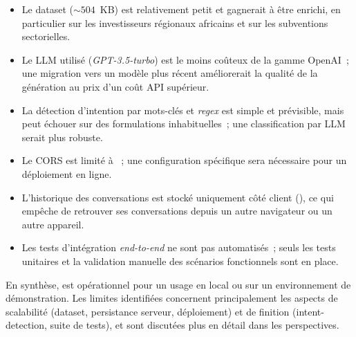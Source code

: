 \begin{itemize}
  \item Le dataset (${\sim}504$~KB) est relativement petit et gagnerait à être enrichi, en particulier sur les investisseurs régionaux africains et sur les subventions sectorielles.
  \item Le \ac{LLM} utilisé (\textit{GPT-3.5-turbo}) est le moins coûteux de la gamme OpenAI~; une migration vers un modèle plus récent améliorerait la qualité de la génération au prix d'un coût \ac{API} supérieur.
  \item La détection d'intention par mots-clés et \textit{regex} est simple et prévisible, mais peut échouer sur des formulations inhabituelles~; une classification par \ac{LLM} serait plus robuste.
  \item Le \ac{CORS} est limité à ~; une configuration spécifique sera nécessaire pour un déploiement en ligne.
  \item L'historique des conversations est stocké uniquement côté client (), ce qui empêche de retrouver ses conversations depuis un autre navigateur ou un autre appareil.
  \item Les tests d'intégration \textit{end-to-end} ne sont pas automatisés~; seuls les tests unitaires et la validation manuelle des scénarios fonctionnels sont en place.
\end{itemize}

\begin{callout}
En synthèse, \tamwil{} est opérationnel pour un usage en local ou sur un environnement de démonstration. Les limites identifiées concernent principalement les aspects de scalabilité (dataset, persistance serveur, déploiement) et de finition (intent-detection, suite de tests), et sont discutées plus en détail dans les perspectives.
\end{callout}
